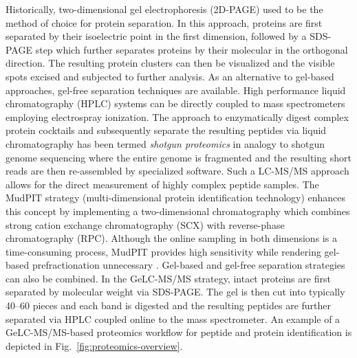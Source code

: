 Historically, two-dimensional gel electrophoresis (2D-PAGE) used to be the 
method of choice for protein separation. 
In this approach, proteins are first separated by their isoelectric point in
the first dimension, followed by a SDS-PAGE step which further separates
proteins by their molecular in the orthogonal direction.
The resulting protein clusters can then be visualized and the visible spots
excised and subjected to further analysis.
As an alternative to gel-based approaches, gel-free separation techniques
are available.
High performance liquid chromatography (HPLC) systems can be directly coupled
to mass spectrometers employing electrospray ionization.
The approach to enzymatically digest complex protein cocktails and subsequently
separate the resulting peptides via liquid chromatography has been termed 
{\em shotgun proteomics} in analogy to shotgun genome sequencing where
the entire genome is fragmented and the resulting short reads are then 
re-assembled by specialized software.
Such a LC-MS/MS approach allows for the direct measurement of highly complex 
peptide samples.
The MudPIT strategy (multi-dimensional protein identification technology) 
enhances this concept by implementing a two-dimensional
chromatography which combines strong cation exchange chromatography (SCX) with
reverse-phase chromatography (RPC).
Although the online sampling in both dimensions is a time-consuming process,
MudPIT provides high sensitivity while rendering gel-based prefractionation 
unnecessary \citep{Washburn2001, Wolters2001}.
Gel-based and gel-free separation strategies can also be combined.
In the GeLC-MS/MS strategy, intact proteins are 
first separated by molecular weight via SDS-PAGE.
The gel is then cut into typically 40--60 pieces and each band is
digested and the resulting peptides are further separated via HPLC
coupled online to the mass spectrometer.
An example of a GeLC-MS/MS-based proteomics workflow for peptide and protein 
identification is depicted in Fig.~\ref{fig:proteomics-overview}.

